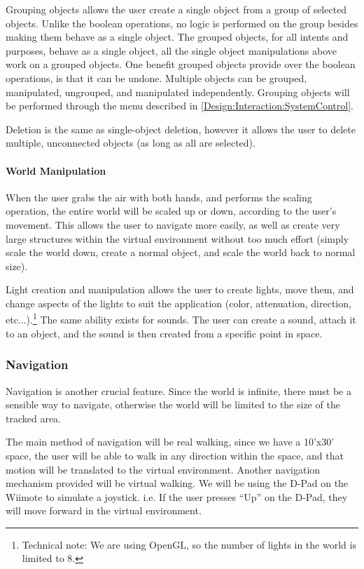 Grouping objects allows the user create a single object from a group of selected objects.
Unlike the boolean operations, no logic is performed on the group besides making them behave as a single object.
The grouped objects, for all intents and purposes, behave as a single object, all the single object manipulations above work on a grouped objects.
One benefit grouped objects provide over the boolean operations, is that it can be undone.
Multiple objects can be grouped, manipulated, ungrouped, and manipulated independently.
Grouping objects will be performed through the menu described in \ref{Design:Interaction:SystemControl}.

Deletion is the same as single-object deletion, however it allows the user to delete multiple, unconnected objects (as long as all are selected).

\paragraph{World Manipulation}
When the user grabs the air with both hands, and performs the scaling operation, the entire world will be scaled up or down, according to the user's movement.
This allows the user to navigate more easily, as well as create very large structures within the virtual environment without too much effort (simply scale the world down, create a normal object, and scale the world back to normal size).

Light creation and manipulation allows the user to create lights, move them, and change aspects of the lights to suit the application (color, attenuation, direction, etc...).\footnote{Technical note: We are using OpenGL, so the number of lights in the world is limited to 8.}
The same ability exists for sounds.
The user can create a sound, attach it to an object, and the sound is then created from a specific point in space.

\subsubsection{Navigation}
\label{Design:Interaction:Navigation}
Navigation is another crucial feature.
Since the world is infinite, there must be a sensible way to navigate, otherwise the world will be limited to the size of the tracked area.

The main method of navigation will be real walking, since we have a 10'x30' space, the user will be able to walk in any direction within the space, and that motion will be translated to the virtual environment.
Another navigation mechanism provided will be virtual walking.
We will be using the D-Pad on the Wiimote to simulate a joystick.
i.e. If the user presses ``Up'' on the D-Pad, they will move forward in the virtual environment.

